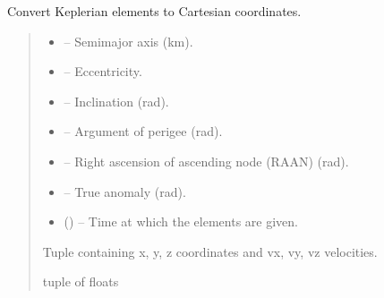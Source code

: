 \documentclass[letterpaper,10pt,english]{sphinxmanual}
\begin{document}

\begin{fulllineitems}
\label{\detokenize{fspsim.utils:fspsim.utils.Conversions.kep2car}}
\pysigstartsignatures
{}
\pysigstopsignatures
\sphinxAtStartPar
Convert Keplerian elements to Cartesian coordinates.
\begin{quote}\begin{description}
\begin{itemize}
\item {} 
\sphinxAtStartPar
{} – Semi\sphinxhyphen{}major axis (km).

\item {} 
\sphinxAtStartPar
{} – Eccentricity.

\item {} 
\sphinxAtStartPar
{} – Inclination (rad).

\item {} 
\sphinxAtStartPar
{} – Argument of perigee (rad).

\item {} 
\sphinxAtStartPar
{} – Right ascension of ascending node (RAAN) (rad).

\item {} 
\sphinxAtStartPar
{} – True anomaly (rad).

\item {} 
\sphinxAtStartPar
{} () – Time at which the elements are given.

\end{itemize}

\sphinxAtStartPar
Tuple containing x, y, z coordinates and vx, vy, vz velocities.

\sphinxAtStartPar
tuple of floats

\end{description}\end{quote}

\end{fulllineitems}
\end{document}
